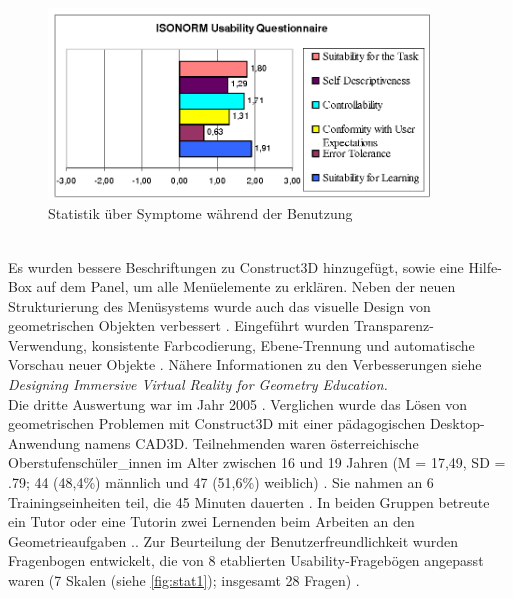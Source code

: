 \documentclass[deutsch]{llncs}
\begin{document}
\begin{figure}[t]
	\centering
	\includegraphics[width=0.9\textwidth]{figures/isonorm}
	\caption{Statistik über Symptome während der Benutzung}
	\label{fig:isonorm}
\end{figure} \\
Es wurden bessere Beschriftungen zu Construct3D hinzugefügt, sowie eine Hilfe-Box auf dem Panel, um alle Menüelemente zu erklären. Neben der neuen Strukturierung des Menüsystems wurde auch das visuelle Design von geometrischen Objekten verbessert  \cite{Kaufmann_summaryof}.  Eingeführt wurden Transparenz-Verwendung, konsistente Farbcodierung, Ebene-Trennung und automatische Vorschau neuer Objekte  \cite{Kaufmann_summaryof}. Nähere Informationen zu den Verbesserungen siehe \textit{Designing Immersive Virtual Reality for Geometry Education.}\\
Die dritte Auswertung war im Jahr 2005  \cite{Kaufmann_summaryof}. Verglichen wurde das Lösen von geometrischen Problemen mit Construct3D mit einer pädagogischen Desktop-Anwendung namens CAD3D. Teilnehmenden waren österreichische Oberstufenschüler\_innen im Alter zwischen 16 und 19 Jahren (M = 17,49, SD = .79; 44 (48,4\%) männlich und 47 (51,6\%) weiblich) \cite{Kaufmann_summaryof}. Sie nahmen an 6 Trainingseinheiten teil, die 45 Minuten dauerten \cite{Kaufmann_summaryof}. In beiden Gruppen betreute ein Tutor oder eine Tutorin zwei Lernenden beim Arbeiten an den Geometrieaufgaben  \cite{Kaufmann_summaryof}.. Zur Beurteilung der Benutzerfreundlichkeit wurden Fragenbogen entwickelt, die von 8 etablierten Usability-Fragebögen angepasst waren (7 Skalen (siehe \autoref{fig:stat1}); insgesamt 28 Fragen)  \cite{Kaufmann_summaryof}. 
\noindent \\
\end{document}
